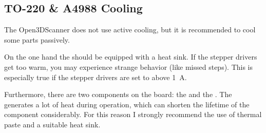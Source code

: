 \subsection{TO-220 \& A4988 Cooling}%
The Open3DScanner does not use active cooling, but it is recommended to cool some parts passively.%

On the one hand the  should be equipped with a heat sink. If the stepper drivers get too warm, you may experience strange behavior (like missed steps). This is especially true if the stepper drivers are set to above \SI{1}{\ampere}.%

Furthermore, there are two  components on the board: the  and the . The  generates a lot of heat during operation, which can shorten the lifetime of the component considerably. For this reason I strongly recommend the use of thermal paste and a suitable heat sink.%

